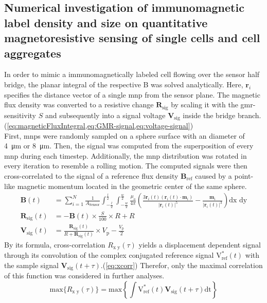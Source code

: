 \subsection{Numerical investigation of immunomagnetic label density and size on quantitative magnetoresistive sensing of single cells and cell aggregates}
In order to mimic a immunomagnetically labeled cell flowing over the sensor half bridge, the planar integral of the respective \acrfull{B} was solved analytically. Here, $\mathbf{r}_i$ specifies the distance vector of a single \gls{mnp} from the sensor plane. The magnetic flux density was converted to a resistive change $\mathbf{R}_\text{sig}$ by scaling it with the \gls{gmr}-sensitivity $S$ and subsequently into a signal voltage $\mathbf{V}_\text{sig}$ inside the bridge branch.(\cref{eq:magneticFluxIntegral,eq:GMR-signal,eq:voltage-signal})\\
First, \glspl{mnp} were randomly sampled on a sphere surface with an diameter of \SI{4}{\micro\meter} or \SI{8}{\micro\meter}. Then, the signal was computed from the superposition of every \gls{mnp} during each timestep. Additionally, the \gls{mnp} distribution was rotated in every iteration to resemble a rolling motion. The computed signals were then cross-correlated to the signal of a reference flux density $\mathbf{B}_\text{ref}$ caused by a point-like magnetic momentum located in the geometric center of the same sphere.
\begin{align}
	\mathbf{B}(t) &= \sum_{i=1}^{N} \frac{1}{A_{\text{Sensor}}} \int_{-\frac{l}{2}}^{\frac{l}{2}} \int_{-\frac{w}{2}}^{\frac{w}{2}} \frac{\mu_{o}}{4 \pi}\left(\frac{3 \mathbf{r}_{i}(t)\left(\mathbf{r}_{i}(t) \cdot \mathbf{m}_{i}\right)}{\left|\mathbf{r}_{i}(t)\right|^{5}}-\frac{\mathbf{m}_{i}}{\left|\mathbf{r}_{i}(t)\right|^{3}}\right) \text{dx dy} \label{eq:magneticFluxIntegral} \\
	\mathbf{R}_\text{sig}(t) &= - \mathbf{B}(t) \times \frac{S}{100} \times R + R \label{eq:GMR-signal}\\
	\mathbf{V}_\text{sig}(t) &= \frac{\mathbf{R}_\text{sig}(t)}{R + \mathbf{R}_\text{sig}(t)}\times V_\text{p} - \frac{V_\text{p}}{2} \label{eq:voltage-signal}
\end{align}
By its formula, cross-correlation $R_\text{x y}(\tau)$ yields a displacement dependent signal through its convolution of the complex conjugated reference signal $\mathrm{V}_\text{ref}^{*}(t)$ with the sample signal $\mathbf{V}_\text{sig}(t+\tau)$.(\cref{eq:xcorr}) Therefor, only the maximal correlation of this function was considered in further analyses.
\begin{equation}
	\mathrm{max}\{R_\text{x y}(\tau)\}=\mathrm{max}\left\{\int \mathrm{V}_\text{ref}^{*}(t) \mathbf{V}_\text{sig}(t+\tau) \text{dt} \right\} \label{eq:xcorr}
\end{equation}


